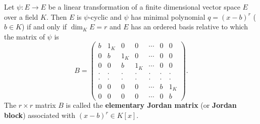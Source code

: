 Let $\psi : E \to E$ be a linear transformation of a finite dimensional vector space $E$ over a field $K$. Then $E$ is $\psi$-cyclic and $\psi$ has minimal polynomial $q = (x - b)^r$ ($b \in K$) if and only if $\dim_K E = r$ and $E$ has an ordered basis relative to which the matrix of $\psi$ is
\[
B = \begin{pmatrix}
b & 1_K & 0 & 0 & \cdots & 0 & 0 \\
0 & b & 1_K & 0 & \cdots & 0 & 0 \\
0 & 0 & b & 1_K & \cdots & 0 & 0 \\
\cdot & \cdot & \cdot & \cdot & \cdot & \cdot & \cdot \\
\cdot & \cdot & \cdot & \cdot & \cdot & \cdot & \cdot \\
0 & 0 & 0 & 0 & \cdots & b & 1_K \\
0 & 0 & 0 & 0 & \cdots & 0 & b
\end{pmatrix}.
\]
The $r \times r$ matrix $B$ is called the \textbf{elementary Jordan matrix} (or \textbf{Jordan block}) associated with $(x - b)^r \in K[x]$.

